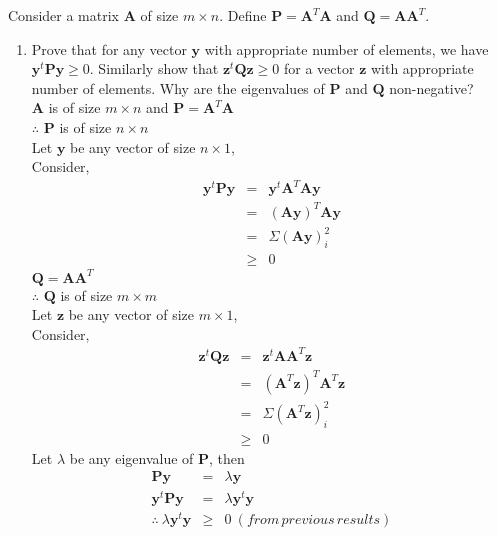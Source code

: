 \documentclass[11pt]{article}
\begin{document}
\maketitle

Consider a matrix $\mathbf{A}$ of size $m \times n$. Define $\mathbf{P} = \mathbf{A}^T \mathbf{A}$ and $\mathbf{Q} = \mathbf{A}\mathbf{A}^T$.
\begin{enumerate}
\item Prove that for any vector $\mathbf{y}$ with appropriate number of elements, we have $\mathbf{y}^t \mathbf{Py} \geq 0$. Similarly show that $\mathbf{z}^t \mathbf{Qz} \geq 0$ for a vector $\mathbf{z}$ with appropriate number of elements. Why are the eigenvalues of $\mathbf{P}$ and $\mathbf{Q}$ non-negative? \\
$\mathbf{A}$ is of size $m \times n$ and $\mathbf{P} = \mathbf{A}^T \mathbf{A}$ \\
$\therefore$ $\mathbf{P}$ is of size $n \times n$ \\
Let $\mathbf{y}$ be any vector of size $n \times 1$, \\
Consider, 
\begin{eqnarray*}
\mathbf{y}^t \mathbf{Py} &=& \mathbf{y}^t  \mathbf{A}^T \mathbf{Ay} \\
&=& (\mathbf{Ay})^T \mathbf{Ay} \\
&=& \Sigma (\mathbf{Ay}) _i ^2 \\
&\geq& 0
\end{eqnarray*}
$\mathbf{Q} = \mathbf{A}\mathbf{A}^T$ \\
$\therefore$ $\mathbf{Q}$ is of size $m \times m$ \\
Let $\mathbf{z}$ be any vector of size $m \times 1$, \\
Consider, 
\begin{eqnarray*}
\mathbf{z}^t \mathbf{Qz} &=& \mathbf{z}^t  \mathbf{AA}^T \mathbf{z} \\
&=& (\mathbf{A}^T \mathbf{z})^T \mathbf{A}^T \mathbf{z} \\
&=& \Sigma (\mathbf{A}^T \mathbf{z}) _i ^2 \\
&\geq& 0
\end{eqnarray*}
Let $\lambda$ be any eigenvalue of $\mathbf{P}$, then
\begin{eqnarray*}
\mathbf{Py} &=& \lambda \mathbf{y} \\
\mathbf{y}^t \mathbf{Py} &=& \lambda  \mathbf{y}^t \mathbf{y} \\
\therefore\:\lambda  \mathbf{y}^t \mathbf{y} &\geq& 0 \:(from\,previous\,results)\\

\end{eqnarray*}
\end{enumerate}
\end{document}
